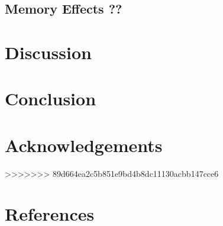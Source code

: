 \documentclass[a4paper, 12pt,oneside]{article}
\begin{document}
		\subsection{Memory Effects ??}

	\section{Discussion}
	\section{Conclusion}
	\section*{Acknowledgements}
>>>>>>> 89d664ea2c5b851e9bd4b8dc11130acbb147cce6
	\section*{References}
\end{document}
